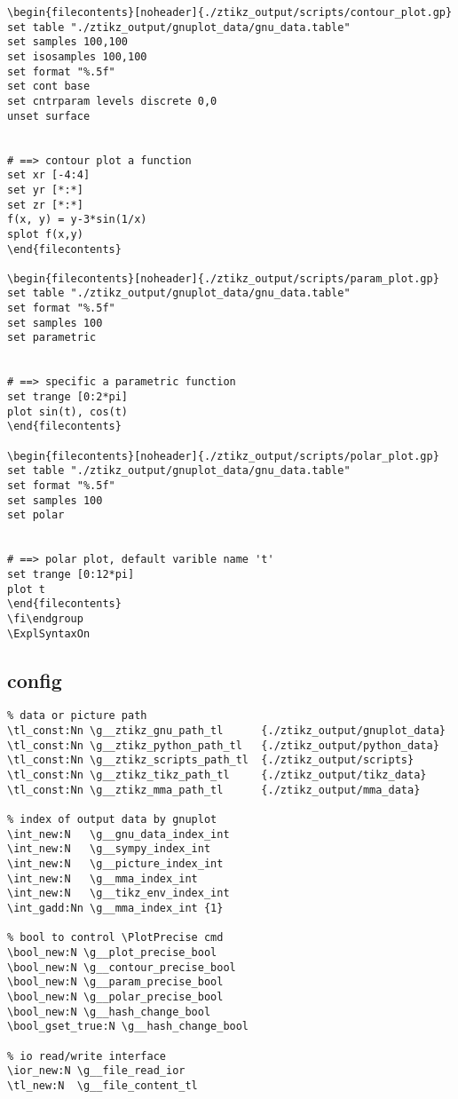 \begin{verbatim}
\begin{filecontents}[noheader]{./ztikz_output/scripts/contour_plot.gp}
set table "./ztikz_output/gnuplot_data/gnu_data.table"
set samples 100,100
set isosamples 100,100
set format "%.5f"
set cont base
set cntrparam levels discrete 0,0
unset surface


# ==> contour plot a function
set xr [-4:4]
set yr [*:*]
set zr [*:*]
f(x, y) = y-3*sin(1/x)
splot f(x,y)
\end{filecontents}

\begin{filecontents}[noheader]{./ztikz_output/scripts/param_plot.gp}
set table "./ztikz_output/gnuplot_data/gnu_data.table"
set format "%.5f"
set samples 100
set parametric


# ==> specific a parametric function
set trange [0:2*pi]
plot sin(t), cos(t)  
\end{filecontents}

\begin{filecontents}[noheader]{./ztikz_output/scripts/polar_plot.gp}
set table "./ztikz_output/gnuplot_data/gnu_data.table"
set format "%.5f"
set samples 100
set polar


# ==> polar plot, default varible name 't'
set trange [0:12*pi]
plot t
\end{filecontents}
\fi\endgroup
\ExplSyntaxOn
\end{verbatim}

\subsection{config}
\begin{verbatim}
% data or picture path
\tl_const:Nn \g__ztikz_gnu_path_tl      {./ztikz_output/gnuplot_data} 
\tl_const:Nn \g__ztikz_python_path_tl   {./ztikz_output/python_data} 
\tl_const:Nn \g__ztikz_scripts_path_tl  {./ztikz_output/scripts}
\tl_const:Nn \g__ztikz_tikz_path_tl     {./ztikz_output/tikz_data}
\tl_const:Nn \g__ztikz_mma_path_tl      {./ztikz_output/mma_data}

% index of output data by gnuplot
\int_new:N   \g__gnu_data_index_int
\int_new:N   \g__sympy_index_int
\int_new:N   \g__picture_index_int
\int_new:N   \g__mma_index_int
\int_new:N   \g__tikz_env_index_int
\int_gadd:Nn \g__mma_index_int {1}

% bool to control \PlotPrecise cmd
\bool_new:N \g__plot_precise_bool
\bool_new:N \g__contour_precise_bool
\bool_new:N \g__param_precise_bool
\bool_new:N \g__polar_precise_bool
\bool_new:N \g__hash_change_bool
\bool_gset_true:N \g__hash_change_bool

% io read/write interface
\ior_new:N \g__file_read_ior
\tl_new:N  \g__file_content_tl
\end{verbatim}

